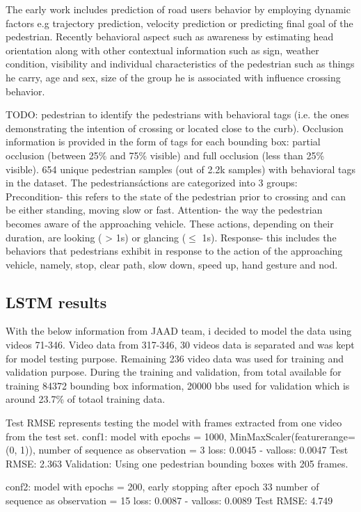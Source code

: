 The early work includes prediction of road users behavior by employing dynamic factors e.g trajectory prediction, velocity prediction or predicting final goal of the pedestrian. Recently behavioral aspect such as awareness by estimating head orientation along with other contextual information such as sign, weather condition, visibility and individual characteristics of the pedestrian such as things he carry, age and sex, size of the group he is associated with influence crossing behavior.

TODO:  pedestrian to identify the pedestrians with behavioral tags (i.e. the ones demonstrating the intention of crossing or located close to the curb). 
Occlusion information is provided in the form of tags for
each bounding box: partial occlusion (between 25\% and 75\%
visible) and full occlusion (less than 25\% visible).
 654 unique pedestrian samples (out of 2.2k samples) with behavioral tags in the
dataset. 
The
pedestrians\' actions are categorized into 3 groups: Precondition- this refers to the state of the pedestrian prior to crossing and can be either standing, moving slow or fast. Attention- the way the pedestrian becomes aware of the approaching vehicle. These actions, depending on their duration, are looking ( > 1s) or glancing ($\leq$ 1s). Response- this
includes the behaviors that pedestrians exhibit in response
to the action of the approaching vehicle, namely, stop, clear path, slow down, speed up, hand gesture and nod.

\subsection{LSTM results}
With the below information from JAAD team, i decided to model the data using videos 71-346.
Video data from 317-346, 30 videos data is separated and was kept for model testing purpose.
Remaining 236 video data was used for training and validation purpose.
During the training and validation, from total available for training 84372 bounding box information, 20000 bbs used for validation which is around 23.7\% of totaol training data.

Test RMSE represents testing the model with frames extracted from one video from the test set.
conf1: model with epochs = 1000, MinMaxScaler(feature\textunderscore range=(0, 1)), 
number of sequence as observation = 3
loss: 0.0045 - val\textunderscore loss: 0.0047 
Test RMSE: 2.363
Validation: Using one pedestrian bounding boxes with 205 frames.

conf2: 
model with epochs = 200, early stopping after epoch 33
number of sequence as observation = 15
loss: 0.0087 - val\textunderscore loss: 0.0089
Test RMSE: 4.749

